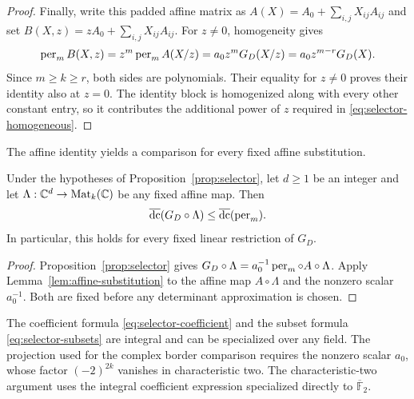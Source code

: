 \begin{proof}
Finally, write this padded affine matrix as
$A(X)=A_0+\sum_{i,j}X_{ij}A_{ij}$ and set
$B(X,z)=zA_0+\sum_{i,j}X_{ij}A_{ij}$.  For $z\ne0$, homogeneity gives
\[
 \operatorname{per}_m B(X,z)
 =z^m\operatorname{per}_m A(X/z)
 =a_0z^mG_D(X/z)
 =a_0z^{m-r}G_D(X).
\]
Since $m\ge k\ge r$, both sides are polynomials.  Their equality for
$z\ne0$ proves their identity also at $z=0$.  The identity block is
homogenized along with every other constant entry, so it contributes
the additional power of $z$ required in
\eqref{eq:selector-homogeneous}.
\end{proof}

The affine identity yields a comparison for every fixed affine substitution.

\begin{corollary}\label{cor:selector-border}
Under the hypotheses of Proposition~\ref{prop:selector}, let $d\ge1$ be an
integer and let
$\Lambda:\mathbb C^d\to\operatorname{Mat}_k(\mathbb C)$ be any fixed affine map.  Then
\[
 \operatorname{\overline{dc}}(G_D\circ\Lambda)\le\operatorname{\overline{dc}}(\operatorname{per}_m).
\]
In particular, this holds for every fixed linear restriction of $G_D$.
\end{corollary}

\begin{proof}
Proposition~\ref{prop:selector} gives
$G_D\circ\Lambda=a_0^{-1}\operatorname{per}_m\circ A\circ\Lambda$.
Apply Lemma~\ref{lem:affine-substitution} to the affine map
$A\circ\Lambda$ and the nonzero scalar $a_0^{-1}$.
Both are fixed before any determinant approximation is chosen.
\end{proof}

\begin{remark}\label{rem:selector-characteristic}
The coefficient formula \eqref{eq:selector-coefficient} and the subset
formula \eqref{eq:selector-subsets} are integral and can be specialized
over any field.  The projection used for the complex border comparison
requires the nonzero scalar $a_0$, whose factor $(-2)^{2k}$ vanishes in
characteristic two.  The characteristic-two argument uses the integral
coefficient expression specialized directly to $\overline{\mathbb F}_2$.
\end{remark}
